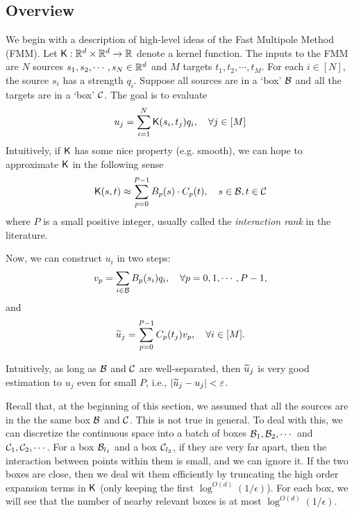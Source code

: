 \subsection{Overview}\label{sec:fastmm_overview}
We begin with a description of high-level ideas of the Fast Multipole Method (FMM). Let $\mathsf{K} : {\mathbb R}^d \times {\mathbb R}^d \rightarrow {\mathbb R}$ denote a kernel function. The inputs to the FMM are $N$ sources $s_1, s_2, \cdots, s_N \in {\mathbb R}^d$  and $M$ targets $t_1, t_2, \cdots, t_M$. For each $i \in [N]$, the source $s_i$ has a strength $q_i$. Suppose all sources are in a `box' ${\cal B}$ and all the targets are in a `box' ${\cal C}$. The goal is to evaluate
\begin{align*}
u_j = \sum_{i=1}^N \mathsf{K} (s_i, t_j ) q_i, ~~~ \forall j \in [M]
\end{align*}
Intuitively, if $\mathsf{K}$ has some nice property (e.g. smooth), we can hope to approximate $\mathsf{K}$ in the following sense
\begin{align*}
\mathsf{K}(s,t) \approx \sum_{p=0}^{P-1} B_p(s) \cdot C_p(t), ~~~ s \in {\cal B} , t \in {\cal C}
\end{align*}
where $P$ is a small positive integer, usually called the \emph{interaction rank} in the literature.

Now, we can construct $u_i$ in two steps:
\begin{align*}
v_p = \sum_{i \in {\cal B}}  B_p (s_i) q_i, ~~~ \forall p = 0,1, \cdots, P-1,
\end{align*}
and
\begin{align*}
\widetilde{u}_j = \sum_{p=0}^{P-1} C_p (t_j) v_p, ~~~ \forall i \in [M].
\end{align*}

Intuitively, as long as ${\cal B}$ and ${\cal C}$ are well-separated, then $\widetilde{u}_j$ is very good estimation to $u_j$ even for small $P$, i.e., $|\widetilde{u}_j - u_j | < \varepsilon$.

Recall that, at the beginning of this section, we assumed that all the sources are in the the same box ${\cal B}$ and ${\cal C}$. This is not true in general. To deal with this, we can discretize the continuous space into a batch of boxes ${\cal B}_1, {\cal B}_2, \cdots $ and ${\cal C}_1, {\cal C}_2, \cdots $. For a box ${\cal B}_{l_1}$ and a box ${\cal C}_{l_2}$, if they are very far apart, then the interaction between points within them is small, and we can ignore it. If the two boxes are close, then we deal wit them efficiently by truncating the high order expansion terms in $\mathsf{K}$ (only keeping the first $\log^{O(d)}(1/\epsilon)$). For each box, we will see that the number of nearby relevant boxes is at most $\log^{O(d)}(1/\epsilon)$.















